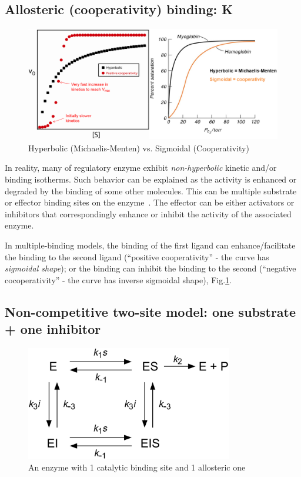 \subsection{Allosteric (cooperativity) binding: K }


\begin{figure}[htb]
  \centerline{\includegraphics[height=5cm]{./images/hyperbolic_sigmoidal_relationship.eps}}
  \caption{Hyperbolic
  (Michaelis-Menten)
  vs. Sigmoidal
  (Cooperativity)}\label{fig:hyperbolic_sigmoidal_relationship}
\end{figure}

  In reality, many of regulatory enzyme exhibit {\it non-hyperbolic}
kinetic and/or binding isotherms. Such behavior can be explained as
the activity is enhanced or degraded by the binding of some other
molecules. This can be multiple substrate or effector binding sites on
the enzyme~\citep{hammes1973kae}. The effector can be either
activators or inhibitors that correspondingly enhance or inhibit the
activity of the associated enzyme.
  

  In multiple-binding models, the binding of the first ligand can
  enhance/facilitate the binding to the second ligand (``positive
  cooperativity'' - the curve has {\it sigmoidal shape}); or the binding
  can inhibit the binding to the second (``negative cocoperativity'' - the
  curve has inverse sigmoidal shape),
  Fig.\ref{fig:hyperbolic_sigmoidal_relationship}.

\subsection[Non-competitive two-site model]{Non-competitive two-site model: one
substrate + one inhibitor}
\label{sec:non-competitive-two}

\begin{figure}[hbt]
  \centerline{\includegraphics[height=5cm,
    angle=0]{./images/1bind_1inhibit.eps}}
  \caption{An enzyme with 1 catalytic binding site and 1 allosteric
    one}
\label{fig:1bind_1inhibit}
\end{figure}

